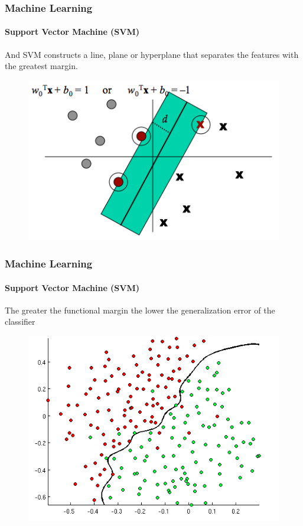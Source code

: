 \documentclass{beamer}
\begin{document}
\begin{frame}
    \frametitle{Machine Learning}
    \framesubtitle{Support Vector Machine (SVM)}
    \par And SVM constructs a line, plane or hyperplane
    that separates the features with the greatest margin.

    \begin{figure}[!htb]
        \centering
    \includegraphics[width=0.9\columnwidth]{fig/SVM1}
        \label{fig:SVM1}
    \end{figure}
\end{frame}
\begin{frame}
    \frametitle{Machine Learning}
    \framesubtitle{Support Vector Machine (SVM)}
    \par The greater the functional margin the lower the
    generalization error of the classifier
    \begin{figure}[!htb]
        \centering
    \includegraphics[width=0.8\columnwidth]{fig/RBFSVM1}
        \label{fig:RBFSVM1}
    \end{figure}
\end{frame}
\end{document}

